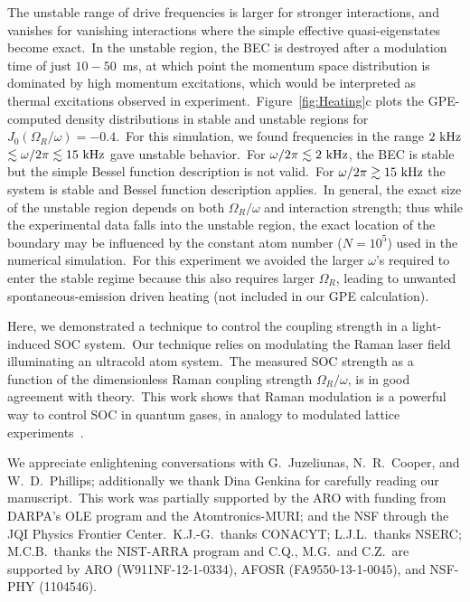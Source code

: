 \documentclass[twocolumn,amsmath,amssymb,floatfix,prl]{revtex4-1}
\begin{document}
The unstable range of drive frequencies is larger for stronger interactions, and vanishes for vanishing interactions where the simple effective quasi-eigenstates become exact.~In the unstable region, the BEC is destroyed after a modulation time of just $10-50 $~ms, at which point the momentum space distribution is dominated by high momentum excitations, which would be interpreted as thermal excitations observed in experiment.~Figure~\ref{fig:Heating}c plots the GPE-computed density distributions in stable and unstable regions for $J_{0}(\Omega _{R}/\omega )=-0.4$.~For this simulation, we found frequencies in the range $2\ {\rm kHz}$ $\lesssim \omega/2\pi \lesssim 15\ {\rm kHz}$ gave unstable behavior.~For $\omega/2\pi \lesssim2\ {\rm kHz}$, the BEC is stable but the simple Bessel function description is not valid.~For $\omega/2\pi \gtrsim 15\ {\rm kHz}$ the system is stable and Bessel function description applies.~In general, the exact size of the unstable region depends on both $\Omega _{R}/\omega$ and interaction strength; thus while the experimental data falls into the unstable region, the exact location of the boundary may be influenced by the constant atom number ($N=10^5$) used in the numerical simulation.~For this experiment we avoided the larger $\omega$'s required to enter the stable regime because this also requires larger $\Omega _{R}$, leading to unwanted spontaneous-emission driven heating (not included in our GPE calculation).

Here, we demonstrated a technique to control the coupling strength in a light-induced SOC system.~Our technique relies on modulating the Raman laser field illuminating an ultracold atom system.~The measured SOC strength as a function of the dimensionless Raman coupling strength $\Omega_R / \omega$, is in good agreement with theory.~This work shows that Raman modulation is a powerful way to control SOC in quantum gases, in analogy to modulated lattice experiments~\cite{Lignier2007,Struck2012}.

We appreciate enlightening conversations with G.~Juzeliunas, N.~R.~Cooper, and W.~D.~Phillips; additionally we thank Dina Genkina for carefully reading our manuscript.~This work was partially supported by the ARO with funding from DARPA's OLE program and the Atomtronics-MURI; and the NSF through the JQI Physics Frontier Center.~K.J.-G.~thanks CONACYT; L.J.L.~thanks NSERC; M.C.B.~thanks the NIST-ARRA program and C.Q., M.G.~and C.Z.~are supported by ARO (W911NF-12-1-0334), AFOSR (FA9550-13-1-0045), and NSF-PHY (1104546).


\end{document}
